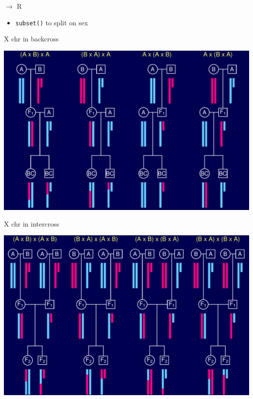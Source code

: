 \documentclass[12pt]{article}
\newcommand{\headsize}{\fontsize{35}{35} \selectfont}
\newcommand{\smallsize}{\fontsize{25}{30} \selectfont}
\begin{document}
\newpage

\headsize \color{myyellow}
$\boldsymbol{\rightarrow}$ R

\vspace{3cm}

\color{mywhite} \smallsize

\hfill \begin{minipage}[t]{9.5in}
\begin{itemize}
\itemsep24pt
\item \verb|subset()| to split on sex
\end{itemize} \end{minipage}


\newpage

\headsize \color{myyellow}
\hfill \begin{minipage}{5.75in}
\centering
X chr in backcross
\end{minipage}

\vfill

\centerline{\includegraphics[]{FigsA/xchr_bc.pdf}}


\newpage

\headsize \color{myyellow}
\hfill \begin{minipage}{5.75in}
\centering
X chr in intercross
\end{minipage}

\vfill

\centerline{\includegraphics[]{FigsA/xchr_f2.pdf}}
\end{document}
